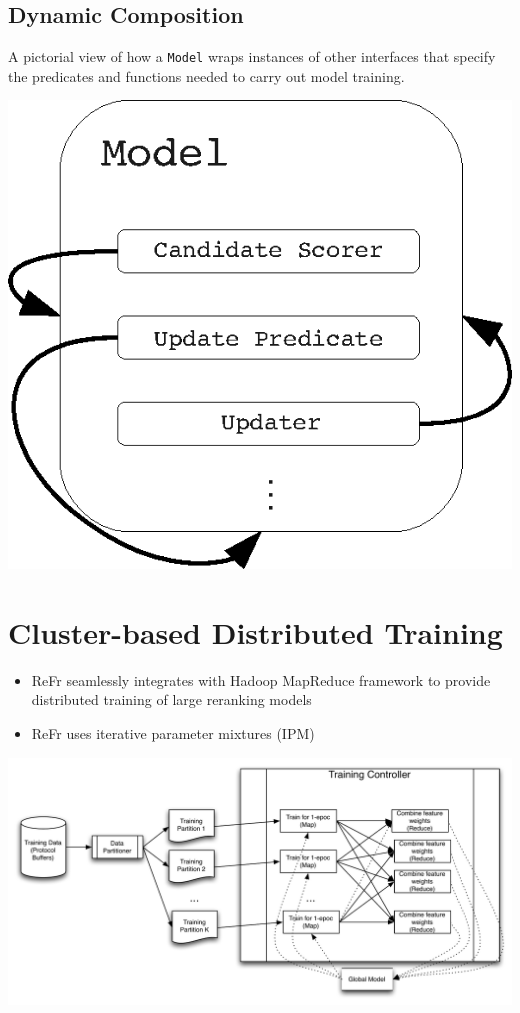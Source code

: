 \documentclass[noback,portrait,twocolumn]{cuposter}
\begin{document}
\subsection{Dynamic Composition}
A pictorial view of how a \texttt{Model}
wraps instances of other interfaces that specify the predicates and
functions needed to carry out model training.

\begin{center}
\includegraphics[bb=120bp 400bp 345bp 610bp,clip,scale=2.0]{figures/model-diagram.eps}
\end{center}

\section{Cluster-based Distributed Training}
\begin{itemize}
  \item ReFr seamlessly integrates with Hadoop MapReduce framework to provide distributed training of large reranking models
  \item ReFr uses iterative parameter mixtures (IPM) \cite{mcdonald10distributed}
\end{itemize}

\vspace{1cm}
\begin{center}
\hspace{-9cm} \includegraphics[scale=1.4]{figures/mapreduceflow} 
\end{center}
\end{document}
